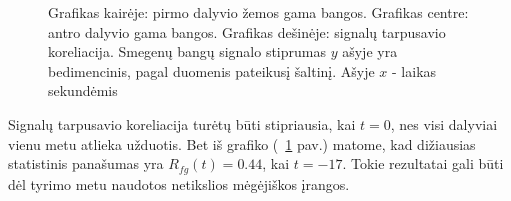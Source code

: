 \begin{figure}
    \caption{Grafikas kairėje: pirmo dalyvio žemos gama bangos. Grafikas centre: antro dalyvio gama bangos. Grafikas dešinėje: signalų tarpusavio koreliacija. Smegenų bangų signalo stiprumas \(y\) ašyje yra bedimencinis, pagal duomenis pateikusį šaltinį. Ašyje \(x\) - laikas sekundėmis}
    \label{fig:brainwaves}
\end{figure}

Signalų tarpusavio koreliacija turėtų būti stipriausia, kai \( t = 0 \), nes visi dalyviai vienu metu atlieka užduotis.
Bet iš grafiko (~\ref{fig:brainwaves} pav.) matome, kad dižiausias statistinis panašumas yra \( R_{fg}(t) = 0.44 \), kai \( t = -17 \).
Tokie rezultatai gali būti dėl tyrimo metu naudotos netikslios mėgėjiškos įrangos.
